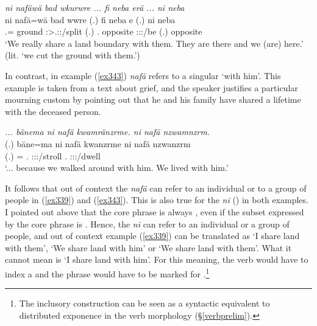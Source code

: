 \begin{exe}
	\ex \emph{ni nafäwä bad wkurwre ... fi neba erä ... ni neba}\\
	\gll ni nafä=wä bad wwre (.) fi neba e (.) ni neba\\
	{\Fnsg} \Third\Pl.\Assoc={\Emph} ground \Fpl:\Sbj>\Tsg.\F:\Nonpast:\Ipfv/split (.) \Third.{\Abs} opposite \Stpl:\Sbj:\Nonpast:\Ipfv/be (.) \First{} opposite\\
	\trans `We really share a land boundary with them. They are there and we (are) here.' (lit. `we cut the ground with them.')
	\label{ex339}
\end{exe}

In contrast, in example (\ref{ex343}) \emph{nafä} refers to a singular `with him'. This example is taken from a text about grief, and the speaker justifies a particular mourning custom by pointing out that he and his family have shared a lifetime with the deceased person.

\begin{exe}
	\ex \emph{... bänema ni nafä kwamränzrme. ni nafä nzwamnzrm.}\\
	\gll (.) bäne=ma ni nafä kwanzrme ni nafä nzwanzrm\\
	(.) \Recog={\Char} {\Fnsg} \Third\Pl.{\Assoc} \Fpl:\Sbj:\Pst:\Dur/stroll {\Fnsg} \Third\Pl.{\Assoc} \Fpl:\Sbj:\Pst:\Dur/dwell\\
	\trans `... because we walked around with him. We lived with him.'\\
	\label{ex343}
\end{exe}

It follows that out of context the  \emph{nafä} can refer to an individual or to a group of people in (\ref{ex339}) and (\ref{ex343}). This is also true for the  \emph{ni} (\Fnsg) in both examples. I pointed out above that the core phrase is always , even if the subset expressed by the core phrase is . Hence, the  \emph{ni} can refer to an individual or a group of people, and out of context example (\ref{ex339}) can be translated as `I share land with them', `We share land with him' or `We share land with them'. What it cannot mean is `I share land with him'. For this meaning, the verb would have to index a  and the  phrase would have to be marked for  .\footnote{The inclusory construction can be seen as a syntactic equivalent to distributed exponence in the verb morphology ({\S}\ref{verbprelim}).}

